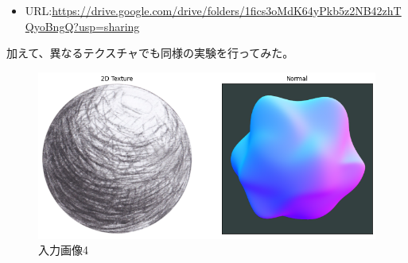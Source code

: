 \documentclass[dvipdfmx]{jsarticle}
\begin{document}
\begin{itemize}
  \item URL:\url{https://drive.google.com/drive/folders/1fics3oMdK64yPkb5z2NB42zhTQyoBngQ?usp=sharing}
\end{itemize}
加えて、異なるテクスチャでも同様の実験を行ってみた。
\begin{figure}[H]
  \centering
  \includegraphics[scale=0.4]{images/blo_input4.png}
  \caption{入力画像4}
\end{figure}
\end{document}
